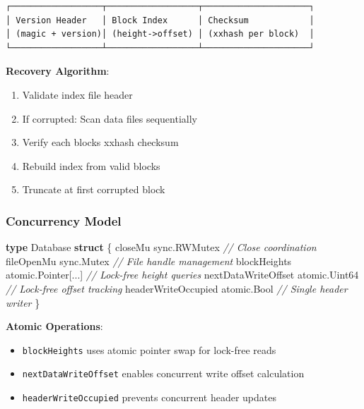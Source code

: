 \documentclass[
]{article}
\newenvironment{Shaded}{}{}
\newcommand{\CommentTok}[1]{\textcolor[rgb]{0.38,0.63,0.69}{\textit{#1}}}
\newcommand{\KeywordTok}[1]{\textcolor[rgb]{0.00,0.44,0.13}{\textbf{#1}}}
\newcommand{\NormalTok}[1]{#1}
\newcommand{\OperatorTok}[1]{\textcolor[rgb]{0.40,0.40,0.40}{#1}}
\providecommand{\tightlist}{%
  \setlength{\itemsep}{0pt}\setlength{\parskip}{0pt}}
\begin{document}
\begin{verbatim}
┌──────────────────┬──────────────────┬─────────────────────┐
│ Version Header   │ Block Index      │ Checksum            │
│ (magic + version)│ (height->offset) │ (xxhash per block)  │
└──────────────────┴──────────────────┴─────────────────────┘
\end{verbatim}

\textbf{Recovery Algorithm}:

\begin{enumerate}
\def\labelenumi{\arabic{enumi}.}
\tightlist
\item
  Validate index file header
\item
  If corrupted: Scan data files sequentially
\item
  Verify each block\textquotesingle s xxhash checksum
\item
  Rebuild index from valid blocks
\item
  Truncate at first corrupted block
\end{enumerate}

\subsubsection{Concurrency Model}\label{concurrency-model-1}

\begin{Shaded}
\begin{Highlighting}[]
\KeywordTok{type}\NormalTok{ Database }\KeywordTok{struct} \OperatorTok{\{}
\NormalTok{    closeMu             sync}\OperatorTok{.}\NormalTok{RWMutex           }\CommentTok{// Close coordination}
\NormalTok{    fileOpenMu          sync}\OperatorTok{.}\NormalTok{Mutex             }\CommentTok{// File handle management}
\NormalTok{    blockHeights        atomic}\OperatorTok{.}\NormalTok{Pointer}\OperatorTok{[...]}    \CommentTok{// Lock{-}free height queries}
\NormalTok{    nextDataWriteOffset atomic}\OperatorTok{.}\NormalTok{Uint64          }\CommentTok{// Lock{-}free offset tracking}
\NormalTok{    headerWriteOccupied atomic}\OperatorTok{.}\NormalTok{Bool            }\CommentTok{// Single header writer}
\OperatorTok{\}}
\end{Highlighting}
\end{Shaded}

\textbf{Atomic Operations}:

\begin{itemize}
\tightlist
\item
  \texttt{blockHeights} uses atomic pointer swap for lock-free reads
\item
  \texttt{nextDataWriteOffset} enables concurrent write offset
  calculation
\item
  \texttt{headerWriteOccupied} prevents concurrent header updates
\end{itemize}
\end{document}

